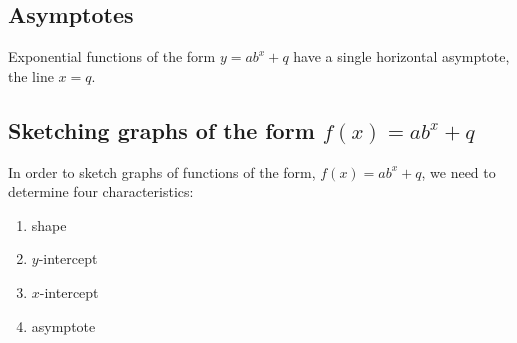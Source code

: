 \subsection*{Asymptotes}

Exponential functions of the form $y=ab^{x}+q$ have a single horizontal asymptote, the line $x=q$. 


\subsection*{Sketching graphs of the form $f(x)=ab^{x}+q$}

In order to sketch graphs of functions of the form, $f(x)=ab^{x}+q$, we need to determine four characteristics:\par 
\begin{enumerate}[noitemsep, label=\textbf{\arabic*}. ] 
\item shape
\item $y$-intercept
\item $x$-intercept
\item asymptote
\end{enumerate}

